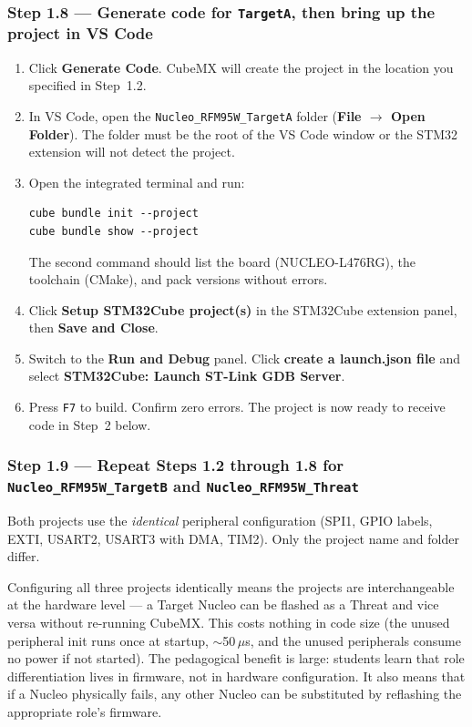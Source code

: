 \documentclass[11pt,letterpaper]{article}
\begin{document}
\newpage
\subsubsection*{Step 1.8 --- Generate code for \texttt{TargetA}, then bring up the project in VS Code}

\begin{enumerate}[leftmargin=2em]
	\item Click \textbf{Generate Code}. CubeMX will create the project in the location you specified in Step~1.2.
	\item In VS Code, open the \texttt{Nucleo\_RFM95W\_TargetA} folder (\textbf{File $\to$ Open Folder}). The folder must be the root of the VS Code window or the STM32 extension will not detect the project.
	\item Open the integrated terminal and run:
\begin{verbatim}
cube bundle init --project
cube bundle show --project
\end{verbatim}
	The second command should list the board (NUCLEO-L476RG), the toolchain (CMake), and pack versions without errors.
	\item Click \textbf{Setup STM32Cube project(s)} in the STM32Cube extension panel, then \textbf{Save and Close}.
	\item Switch to the \textbf{Run and Debug} panel. Click \textbf{create a launch.json file} and select \textbf{STM32Cube: Launch ST-Link GDB Server}.
	\item Press \texttt{F7} to build. Confirm zero errors. The project is now ready to receive code in Step~2 below.
\end{enumerate}

\subsubsection*{Step 1.9 --- Repeat Steps 1.2 through 1.8 for \texttt{Nucleo\_RFM95W\_TargetB} and \texttt{Nucleo\_RFM95W\_Threat}}

Both projects use the \emph{identical} peripheral configuration (SPI1, GPIO labels, EXTI, USART2, USART3 with DMA, TIM2). Only the project name and folder differ.

\begin{tcolorbox}[infobox={Why Configure USART3 + DMA + EXTI on TargetA and TargetB Even Though Only Threat Uses Them?}]
	Configuring all three projects identically means the projects are interchangeable at the hardware level --- a Target Nucleo can be flashed as a Threat and vice versa without re-running CubeMX. This costs nothing in code size (the unused peripheral init runs once at startup, $\sim$50\,$\mu$s, and the unused peripherals consume no power if not started). The pedagogical benefit is large: students learn that role differentiation lives in firmware, not in hardware configuration. It also means that if a Nucleo physically fails, any other Nucleo can be substituted by reflashing the appropriate role's firmware.
\end{tcolorbox}
\end{document}
